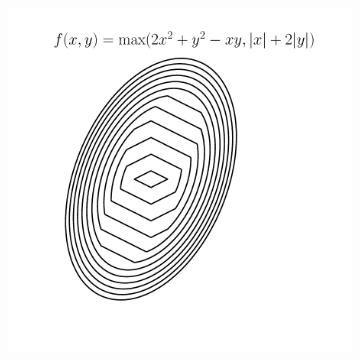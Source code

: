 \begin{figure}[t]
\begin{subfigure}{0.325\textwidth}
        \caption{}
    \end{subfigure}
    \begin{subfigure}{0.325\textwidth}
        \includegraphics[height=1.02\linewidth]{ebookML_src/src/convexity/max_2d.pdf}
        \caption{}
    \end{subfigure}


\end{figure}
